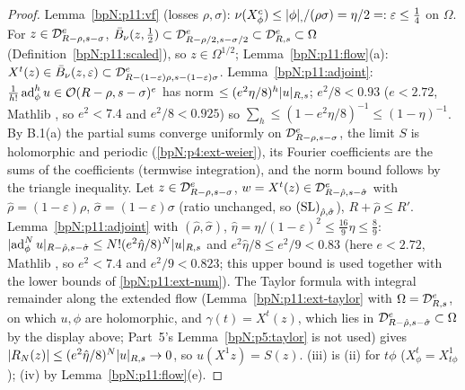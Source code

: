\begin{proof}
\label{stepN:p11:co-field} Lemma~\ref{bpN:p11:vf} (losses $\rho,\sigma$): $\nu(X^c_\phi)\le\lvert \phi\rvert_{,}/(\rho\sigma)=\eta/2=:\varepsilon\le\frac14$ on $\Omega$. For $z\in\mathcal D_{R-\rho,s-\sigma}^e$, $\bar B_\nu(z,\frac12)\subset\mathcal D_{R-\rho/2,s-\sigma/2}^e\subset\mathcal D_{R,s}^e\subset\Omega$ (Definition~\ref{bpN:p11:scaled}), so $z\in\Omega^{1/2}$; Lemma~\ref{bpN:p11:flow}(a): $X^t(z)\in\bar B_\nu(z,\varepsilon)\subset\mathcal D_{R-(1-\varepsilon)\rho,s-(1-\varepsilon)\sigma}^e$.
\label{stepN:p11:co-series} Lemma~\ref{bpN:p11:adjoint}: $\frac1{h!}\operatorname{ad}^h_\phi u\in\mathcal O(R-\rho,s-\sigma)^e$ has norm $\le(e^2\eta/8)^h\lvert u\rvert_{R,s}$; $e^2/8<0.93$ ($e<2.72$, Mathlib , so $e^2<7.4$ and $e^2/8<0.925$) so $\sum_h\le(1-e^2\eta/8)^{-1}\le(1-\eta)^{-1}$. By B.1(a) the partial sums converge uniformly on $\mathcal D_{R-\rho,s-\sigma}^e$, the limit $S$ is holomorphic and periodic (\ref{bpN:p4:ext-weier}), its Fourier coefficients are the sums of the coefficients (termwise integration), and the norm bound follows by the triangle inequality.
\label{stepN:p11:co-remainder} Let $z\in\mathcal D_{R-\rho,s-\sigma}^e$, $w=X^t(z)\in\mathcal D_{R-\hat\rho,s-\hat\sigma}^e$ with $\hat\rho=(1-\varepsilon)\rho$, $\hat\sigma=(1-\varepsilon)\sigma$ (ratio unchanged, so $\textup{(SL)}_{\hat\rho,\hat\sigma}$), $R+\hat\rho\le R'$. Lemma~\ref{bpN:p11:adjoint} with $(\hat\rho,\hat\sigma)$, $\hat\eta=\eta/(1-\varepsilon)^2\le\frac{16}9\eta\le\frac89$: $\lvert \operatorname{ad}^N_\phi u\rvert_{R-\hat\rho,s-\hat\sigma}\le N!(e^2\hat\eta/8)^N\lvert u\rvert_{R,s}$ and $e^2\hat\eta/8\le e^2/9<0.83$ (here $e<2.72$, Mathlib , so $e^2<7.4$ and $e^2/9<0.823$; this upper bound is used together with the lower bounds of \ref{bpN:p11:ext-num}). The Taylor formula with integral remainder along the extended flow (Lemma~\ref{bpN:p11:ext-taylor} with $\Omega=\mathcal D_{R,s}^e$, on which $u,\phi$ are holomorphic, and $\gamma(t)=X^t(z)$, which lies in $\mathcal D_{R-\hat\rho,s-\hat\sigma}^e\subset\Omega$ by the display above; Part~5's Lemma~\ref{bpN:p5:taylor} is not used) gives $\lvert R_N(z)\rvert\le(e^2\hat\eta/8)^N\lvert u\rvert_{R,s}\to0$, so $u(X^1z)=S(z)$. (iii) is (ii) for $t\phi$ ($X^t_\phi=X^1_{t\phi}$); (iv) by Lemma~\ref{bpN:p11:flow}(e).
\end{proof}

